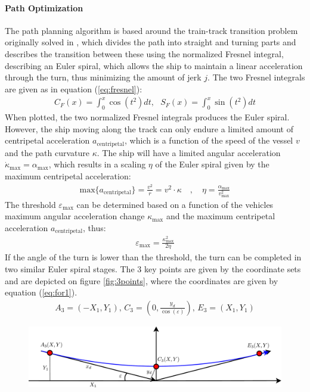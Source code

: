\documentclass[a0,portrait]{a0poster}
\begin{document}
\begin{center}
{\paragraph{Path Optimization}
The path planning algorithm is based around the train-track transition problem originally solved in \cite{arthur}, which divides the path into straight and turning parts and describes the transition between these using the normalized Fresnel integral, describing an Euler spiral, which allows the ship to maintain a linear acceleration through the turn, thus minimizing the amount of jerk $j$. The two Fresnel integrals are given as in equation (\ref{eq:fresnel}):
\begin{align}
C_F(x) = \int_0^x \cos(t^2)dt,\,\,\,\,S_F(x) = \int_0^x \sin(t^2)dt
\label{eq:fresnel}
\end{align}
When plotted, the two normalized Fresnel integrals produces the Euler spiral. However, the ship moving along the track can only endure a limited amount of centripetal acceleration $a_\text{centripetal}$, which is a function of the speed of the vessel $v$ and the path curvature $\kappa$. The ship will have a limited angular acceleration $\dot{\kappa}_\text{max} = \alpha_\text{max}$, which results in a scaling $\eta$ of the Euler spiral given by the maximum centripetal acceleration:
\begin{align}
\text{max}\{a_\text{centripetal}\} = \frac{v^2}{r} = v^2 \cdot \kappa \quad , \quad \eta = \frac{\alpha_\text{max}}{v^2_\text{max}}
\end{align}
The threshold $\varepsilon_\text{max}$ can be determined based on a function of the vehicles maximum angular acceleration change $\kappa_\text{max}$ and the maximum centripetal acceleration $a_\text{centripetal}$, thus:
\begin{align}
\varepsilon_\text{max} = \frac{\kappa^2_\text{max}}{2\eta}
\end{align}
If the angle of the turn is lower than the threshold, the turn can be completed in two similar Euler spiral stages. The 3 key points are given by the coordinate sets and are depicted on figure \ref{fig:3points}, where the coordinates are given by equation (\ref{eq:for1}).
\begin{align}
A_3 = (-X_1,Y_1),\, C_3 = \left(0,\frac{y_d}{\cos(\varepsilon)}\right),\, E_3 = (X_1,Y_1)
\label{eq:for1}
\end{align}
\begin{figure}
	\begin{center}
		\includegraphics[width=\threecolwidth]{img/3Points} %

\end{center}
\end{figure}}
\end{center}
\end{document}
